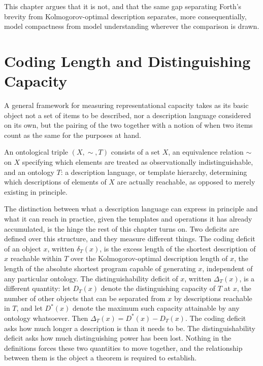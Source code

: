 This chapter argues that it is not, and that the same gap separating Forth's brevity from Kolmogorov-optimal description separates, more consequentially, model compactness from model understanding wherever the comparison is drawn.

\section{Coding Length and Distinguishing Capacity}

A general framework for measuring representational capacity takes as its basic object not a set of items to be described, nor a description language considered on its own, but the pairing of the two together with a notion of when two items count as the same for the purposes at hand.

\begin{definition}
An ontological triple $(X,\sim,T)$ consists of a set $X$, an equivalence relation $\sim$ on $X$ specifying which elements are treated as observationally indistinguishable, and an ontology $T$: a description language, or template hierarchy, determining which descriptions of elements of $X$ are actually reachable, as opposed to merely existing in principle.
\end{definition}

The distinction between what a description language can express in principle and what it can reach in practice, given the templates and operations it has already accumulated, is the hinge the rest of this chapter turns on. Two deficits are defined over this structure, and they measure different things. The coding deficit of an object $x$, written $\delta_T(x)$, is the excess length of the shortest description of $x$ reachable within $T$ over the Kolmogorov-optimal description length of $x$, the length of the absolute shortest program capable of generating $x$, independent of any particular ontology. The distinguishability deficit of $x$, written $\Delta_T(x)$, is a different quantity: let $D_T(x)$ denote the distinguishing capacity of $T$ at $x$, the number of other objects that can be separated from $x$ by descriptions reachable in $T$, and let $D^\ast(x)$ denote the maximum such capacity attainable by any ontology whatsoever. Then $\Delta_T(x) = D^\ast(x) - D_T(x)$. The coding deficit asks how much longer a description is than it needs to be. The distinguishability deficit asks how much distinguishing power has been lost. Nothing in the definitions forces these two quantities to move together, and the relationship between them is the object a theorem is required to establish.

